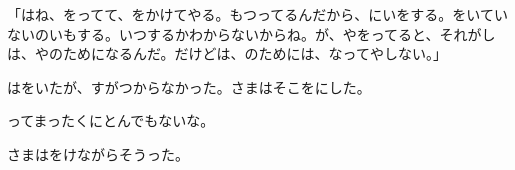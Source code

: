 「はね、をってて、をかけてやる。もつってるんだから、にいをする。をいていないのいもする。いつするかわからないからね。が、やをってると、それがしは、やのためになるんだ。だけどは、のためには、なってやしない。」

はをいたが、すがつからなかった。さまはそこをにした。

ってまったくにとんでもないな。

さまはをけながらそうった。


